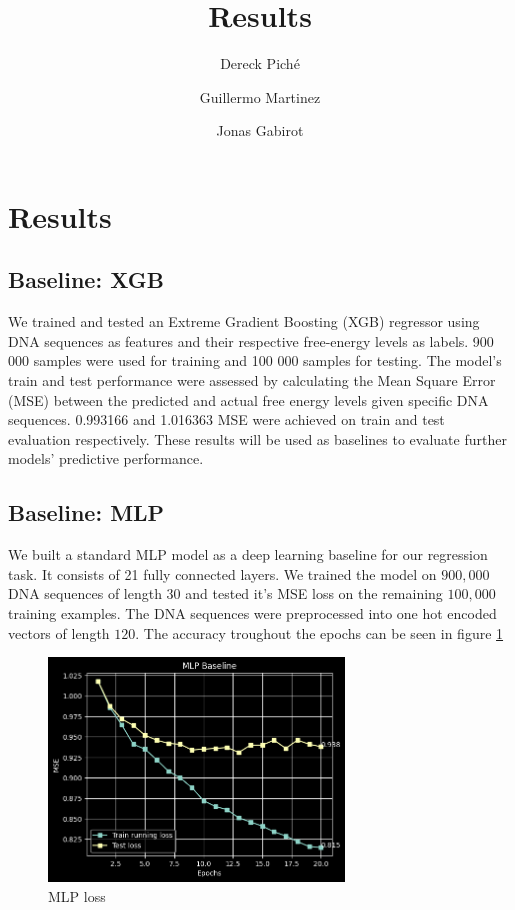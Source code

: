 \documentclass{article}
\title{Results}
\author
{
    Dereck Piché \and
    Guillermo Martinez \and
    Jonas Gabirot \and
}
\begin{document}
\maketitle

\section{Results}

\subsection{Baseline: XGB}
We trained and tested an Extreme Gradient Boosting (XGB) regressor using DNA sequences as features and their respective free-energy levels as labels. 900 000 samples were used for training and 100 000 samples for testing. The model's train and test performance were assessed by calculating the Mean Square Error (MSE) between the predicted and actual free energy levels given specific DNA sequences. 0.993166 and 1.016363 MSE were achieved on train and test evaluation respectively. These results will be used as baselines to evaluate further models' predictive performance.


\subsection{Baseline: MLP}
We built a standard MLP model as a deep learning baseline for our regression task. It consists of 21 fully connected layers. We trained the model on $900, 000$ DNA sequences of length $30$ and tested it's MSE loss on the remaining $100,000$ training examples. The DNA sequences were preprocessed into one hot encoded vectors of length $120$. The accuracy troughout the epochs can be seen in figure \ref{fig:mlp} 
\begin{figure} \label{fig:mlp}
    \caption{MLP loss} \center
    \includegraphics[width=0.7\textwidth]{images/mlp.png}
\end{figure}
\end{document}
